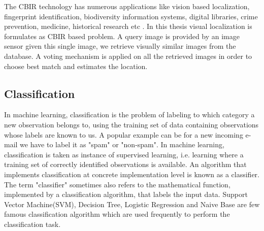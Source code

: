 The CBIR technology has numerous applications like vision based localization, fingerprint identification, biodiversity information systems, digital libraries, crime prevention, medicine,
historical research etc \cite{gudivada1995content}. In this thesis visual localization is formulates as CBIR based problem.
A query image is provided by an image sensor given this single image, we retrieve visually similar images from the database. A voting mechanism is applied on all the retrieved images in order to choose best match
and estimates the location.

\subsection{Classification}
In machine learning, classification is the problem of labeling to which category a new observation belongs to, using the training set of data containing observations whose labels are known to us. A popular example can be for a new incoming e-mail  we have to label it as "spam" or "non-spam". In machine learning,  classification is taken as instance of supervised learning, i.e. learning where a training set of correctly identified observations is available. An algorithm that implements classification at concrete implementation level is known as a classifier. The term "classifier" sometimes also refers to the mathematical function, implemented by a classification algorithm, that labels the input data.
Support Vector Machine(SVM), Decision Tree, Logistic Regression and Naive Base are few famous classification algorithm which are used frequently to perform the classification task.


